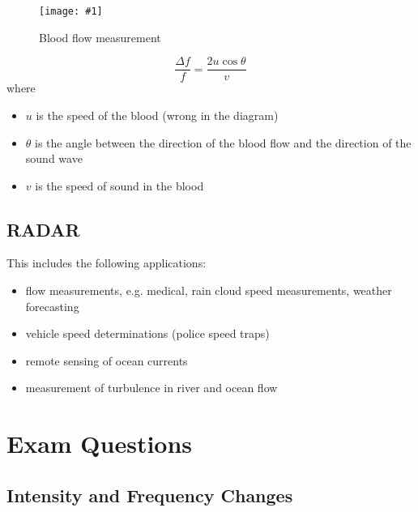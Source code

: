 \documentclass[a4paper,12pt]{article}
\let\oldsection\section
\renewcommand\section{\clearpage\oldsection}
\newcommand{\img}[4]{\begin{center}
  \begin{figure}[H]
    \centering
    \texttt{[image: \#1]}
    \caption{#3}
    \label{fig:#4}
  \end{figure}
\end{center}}
\begin{document}
\img{bloodvessel.png}{0.5}{Blood flow measurement}{bloodvessel}

\begin{equation}
  \frac{\Delta f}{f} = \frac{2u\cos\theta}{v}
\end{equation}
where
\begin{itemize}
  \item $u$ is the speed of the blood (wrong in the diagram)
  \item $\theta$ is the angle between the direction of the blood flow and the direction of the sound wave
  \item $v$ is the speed of sound in the blood
\end{itemize}

\pagebreak

\subsection{RADAR}

This includes the following applications:
\begin{itemize}
  \item flow measurements, e.g. medical, rain cloud speed measurements, weather forecasting
  \item vehicle speed determinations (police speed traps)
  \item remote sensing of ocean currents
  \item measurement of turbulence in river and ocean flow
\end{itemize}

\section{Exam Questions}

\subsection{Intensity and Frequency Changes}
\end{document}
